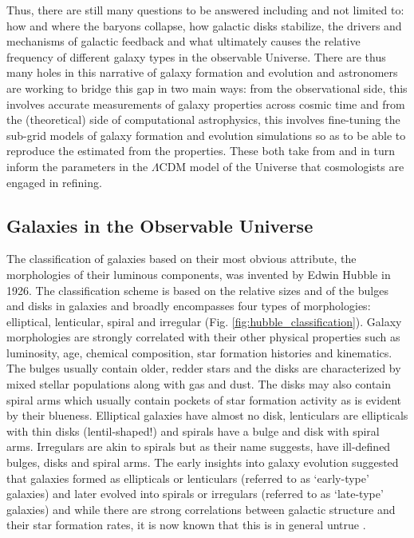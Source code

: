 Thus, there are still many questions to be answered including and not limited to: how and where the baryons collapse, how galactic disks stabilize, the drivers and mechanisms of galactic feedback and what ultimately causes the relative frequency of different galaxy types in the observable Universe. There are thus many holes in this narrative of galaxy formation and evolution and astronomers are working to bridge this gap in two main ways: from the observational side, this involves accurate measurements of galaxy properties across cosmic time and from the (theoretical) side of computational astrophysics, this involves fine-tuning the sub-grid models of galaxy formation and evolution simulations so as to be able to reproduce the estimated from the properties. These both take from and in turn inform the parameters in the $\Lambda$CDM model of the Universe that cosmologists are engaged in refining.\\

\subsection{Galaxies in the Observable Universe}

The classification of galaxies based on their most obvious attribute, the morphologies of their luminous components, was invented by Edwin Hubble in 1926. The classification scheme is based on the relative sizes and of the bulges and disks in galaxies and broadly encompasses four types of morphologies: elliptical, lenticular, spiral and irregular (Fig. \ref{fig:hubble_classification}). Galaxy morphologies are strongly correlated with their other physical properties such as luminosity, age, chemical composition, star formation histories and kinematics. The bulges usually contain older, redder stars and the disks are characterized by mixed stellar populations along with gas and dust. The disks may also contain spiral arms which usually contain pockets of star formation activity as is evident by their blueness. Elliptical galaxies have almost no disk, lenticulars are ellipticals with thin disks (lentil-shaped!) and spirals have a bulge and disk with spiral arms. Irregulars are akin to spirals but as their name suggests, have ill-defined bulges, disks and spiral arms. The early insights into galaxy evolution suggested that galaxies formed as ellipticals or lenticulars (referred to as `early-type' galaxies) and later evolved into spirals or irregulars (referred to as `late-type' galaxies) and while there are strong correlations between galactic structure and their star formation rates, it is now known that this is in general untrue .\\


